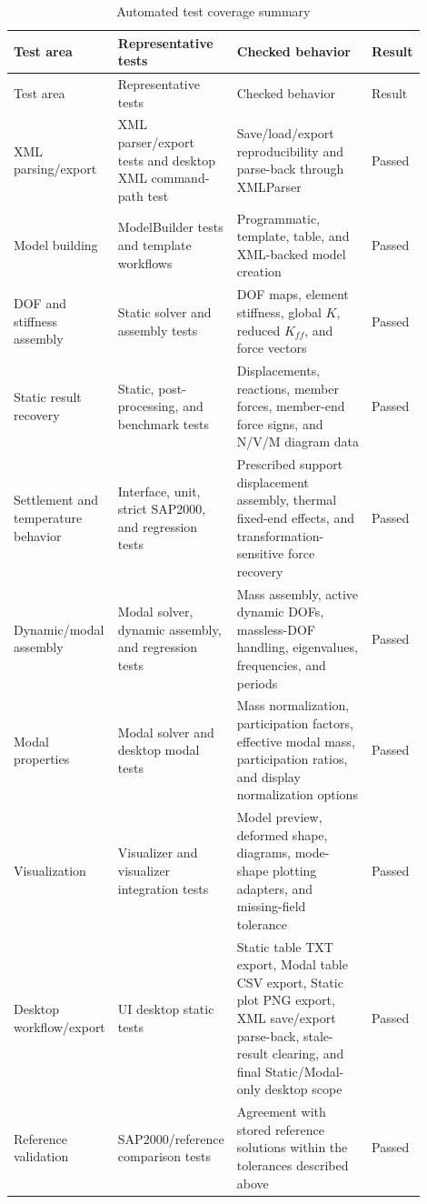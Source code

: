 \documentclass[11pt,a4paper]{article}
\begin{document}
\begin{longtable}{L{0.19\linewidth}L{0.26\linewidth}L{0.37\linewidth}L{0.08\linewidth}}
\caption{Automated test coverage summary}\\
\toprule
Test area & Representative tests & Checked behavior & Result \\
\midrule
\endfirsthead
\toprule
Test area & Representative tests & Checked behavior & Result \\
\midrule
\endhead
XML parsing/export & XML parser/export tests and desktop XML command-path test & Save/load/export reproducibility and parse-back through XMLParser & Passed \\
Model building & ModelBuilder tests and template workflows & Programmatic, template, table, and XML-backed model creation & Passed \\
DOF and stiffness assembly & Static solver and assembly tests & DOF maps, element stiffness, global \(K\), reduced \(K_{ff}\), and force vectors & Passed \\
Static result recovery & Static, post-processing, and benchmark tests & Displacements, reactions, member forces, member-end force signs, and N/V/M diagram data & Passed \\
Settlement and temperature behavior & Interface, unit, strict SAP2000, and regression tests & Prescribed support displacement assembly, thermal fixed-end effects, and transformation-sensitive force recovery & Passed \\
Dynamic/modal assembly & Modal solver, dynamic assembly, and regression tests & Mass assembly, active dynamic DOFs, massless-DOF handling, eigenvalues, frequencies, and periods & Passed \\
Modal properties & Modal solver and desktop modal tests & Mass normalization, participation factors, effective modal mass, participation ratios, and display normalization options & Passed \\
Visualization & Visualizer and visualizer integration tests & Model preview, deformed shape, diagrams, mode-shape plotting adapters, and missing-field tolerance & Passed \\
Desktop workflow/export & UI desktop static tests & Static table TXT export, Modal table CSV export, Static plot PNG export, XML save/export parse-back, stale-result clearing, and final Static/Modal-only desktop scope & Passed \\
Reference validation & SAP2000/reference comparison tests & Agreement with stored reference solutions within the tolerances described above & Passed \\
\bottomrule
\end{longtable}
\end{document}
